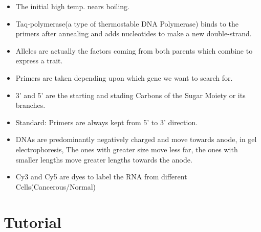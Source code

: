 \documentclass{article}
\begin{document}
\begin{itemize}
  \item The initial high temp. nears boiling.
  \item Taq-polymerase(a type of thermostable DNA Polymerase) binds to the primers after annealing and adds nucleotides to make a new double-strand.
  \item Alleles are actually the factors coming from both parents which combine to express a trait.
  \item Primers are taken depending upon which gene we want to search for.
  \item 3' and 5' are the starting and stading Carbons of the Sugar Moiety or its branches.
  \item Standard: Primers are always kept from 5' to 3' direction.
  \item DNAs are predominantly negatively charged and move towards anode, in gel electrophoresis, The ones with greater size move less far, the ones with smaller lengths move greater lengths towards the anode.
  \item Cy3 and Cy5 are dyes to label the RNA from different Cells(Cancerous/Normal)
\end{itemize}

\section{Tutorial}
\end{document}
